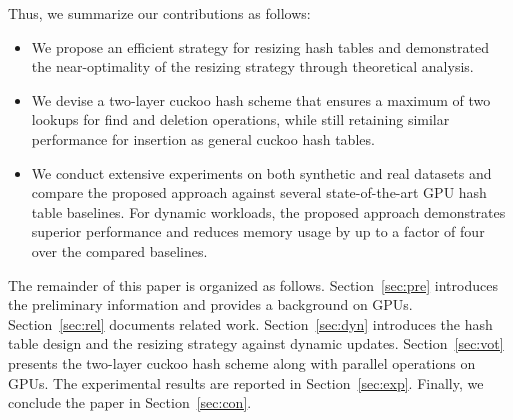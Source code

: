 
Thus, we summarize our contributions as follows:
\begin{itemize}
	\item We propose an efficient strategy for resizing hash tables and demonstrated the near-optimality of the resizing strategy through theoretical analysis.
	\item We devise a two-layer cuckoo hash scheme that ensures a maximum of two lookups for find and deletion operations, while still retaining similar performance for insertion as general cuckoo hash tables. 
	\item We conduct extensive experiments on both synthetic and real datasets and compare the proposed approach against several state-of-the-art GPU hash table baselines. For dynamic workloads, the proposed approach demonstrates superior performance and reduces memory usage by up to a factor of four over the compared baselines.
\end{itemize}

The remainder of this paper is organized as follows. Section~\ref{sec:pre} introduces the preliminary information and provides a background on GPUs. 
Section~\ref{sec:rel} documents related work.
Section~\ref{sec:dyn} introduces the hash table design and the resizing strategy against dynamic updates.
Section~\ref{sec:vot} presents the two-layer cuckoo hash scheme along with parallel operations on GPUs. The experimental results are reported in Section~\ref{sec:exp}. Finally, we conclude the paper in Section~\ref{sec:con}.